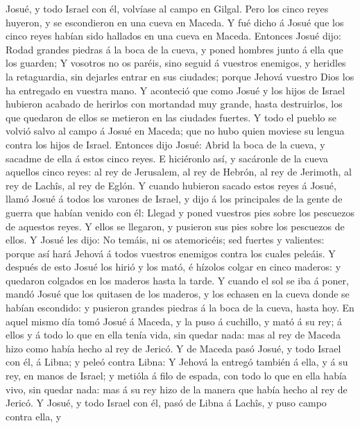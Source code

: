 Josué, y todo Israel con él, volvíase al campo en Gilgal. 
Pero los cinco reyes huyeron, y se escondieron en una cueva en Maceda.
 Y fué dicho á Josué que los cinco reyes habían sido
hallados en una cueva en Maceda.  Entonces Josué dijo:
Rodad grandes piedras á la boca de la cueva, y poned hombres junto á
ella que los guarden;  Y vosotros no os paréis, sino seguid
á vuestros enemigos, y heridles la retaguardia, sin dejarles entrar en
sus ciudades; porque Jehová vuestro Dios los ha entregado en vuestra
mano.  Y aconteció que como Josué y los hijos de Israel
hubieron acabado de herirlos con mortandad muy grande, hasta
destruirlos, los que quedaron de ellos se metieron en las ciudades
fuertes.  Y todo el pueblo se volvió salvo al campo á Josué
en Maceda; que no hubo quien moviese su lengua contra los hijos de
Israel.  Entonces dijo Josué: Abrid la boca de la cueva, y
sacadme de ella á estos cinco reyes.  E hiciéronlo así, y
sacáronle de la cueva aquellos cinco reyes: al rey de Jerusalem, al rey
de Hebrón, al rey de Jerimoth, al rey de Lachîs, al rey de Eglón.
 Y cuando hubieron sacado estos reyes á Josué, llamó Josué
á todos los varones de Israel, y dijo á los principales de la gente de
guerra que habían venido con él: Llegad y poned vuestros pies sobre los
pescuezos de aquestos reyes. Y ellos se llegaron, y pusieron sus pies
sobre los pescuezos de ellos.  Y Josué les dijo: No temáis,
ni os atemoricéis; sed fuertes y valientes: porque así hará Jehová á
todos vuestros enemigos contra los cuales peleáis.  Y
después de esto Josué los hirió y los mató, é hízolos colgar en cinco
maderos: y quedaron colgados en los maderos hasta la tarde.
 Y cuando el sol se iba á poner, mandó Josué que los
quitasen de los maderos, y los echasen en la cueva donde se habían
escondido: y pusieron grandes piedras á la boca de la cueva, hasta hoy.
 En aquel mismo día tomó Josué á Maceda, y la puso á
cuchillo, y mató á su rey; á ellos y á todo lo que en ella tenía vida,
sin quedar nada: mas al rey de Maceda hizo como había hecho al rey de
Jericó.  Y de Maceda pasó Josué, y todo Israel con él, á
Libna; y peleó contra Libna:  Y Jehová la entregó también á
ella, y á su rey, en manos de Israel; y metióla á filo de espada, con
todo lo que en ella había vivo, sin quedar nada: mas á su rey hizo de la
manera que había hecho al rey de Jericó.  Y Josué, y todo
Israel con él, pasó de Libna á Lachîs, y puso campo contra ella, y

